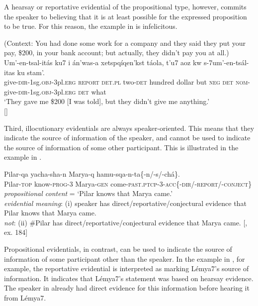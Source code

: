 A hearsay or reportative evidential of the propositional type, however, commits the speaker to believing that it is at least possible for the expressed proposition to be true. For this reason, the  example in  is infelicitous.


\ea \label{ex:17.12}
(Context: You had done some work for a company and they said they put your pay, \$200, in your bank account; but actually, they didn’t pay you at all.)\\
\gll *Um’-en-tsal-itás  ku7  i  án’was-a  xetspqíqen’kst  táola, t’u7  aoz  kw  s-7um’-en-tsál-itas  ku  stam’.\\
 give-\textsc{dir}-1sg.\textsc{obj}-3pl.\textsc{erg}  \textsc{report}  \textsc{det.pl}  two-\textsc{det}  hundred  dollar but  \textsc{neg}  \textsc{det}  \textsc{nom}-give-\textsc{dir}-1sg.\textsc{obj}-3pl.\textsc{erg}  \textsc{det}  what\\
\glt ‘They gave me \$200 [I was told], but they didn’t give me anything.’\\
   {}[\citealt{MatthewsonEtAl2007}]
\z


Third, illocutionary evidentials are always speaker-oriented. This means that they indicate the source of information of the speaker, and cannot be used to indicate the source of information of some other participant. This is illustrated in the  example in .


\ea \label{ex:17.13}
\gll Pilar-qa  yacha-sha-n  Marya-q  hamu-sqa-n-ta\{-n/-s/-chá\}.\\
Pilar-\textsc{top}  know-\textsc{prog}-3  Marya-\textsc{gen}  come-\textsc{past.ptcp}-3-\textsc{acc\{-dir}/-\textsc{report}/-\textsc{conject\}}\\
\glt \textit{propositional content} = ‘Pilar knows that Marya came.’\\
\textit{evidential meaning}: (i) speaker has direct/reportative/conjectural evidence that Pilar knows that Marya came.\\
\textit{not}: (ii) \#Pilar has direct/reportative/conjectural evidence that Marya came. 
     {}[\citealt{Faller2002}, ex. 184]
\z


Propositional evidentials, in contrast, can be used to indicate the source of information of some participant other than the speaker. In the  example in , for example, the reportative evidential is interpreted as marking Lémya7’s source of information. It indicates that Lémya7’s statement was based on hearsay evidence. The speaker in  already had direct evidence for this information before hearing it from Lémya7.

